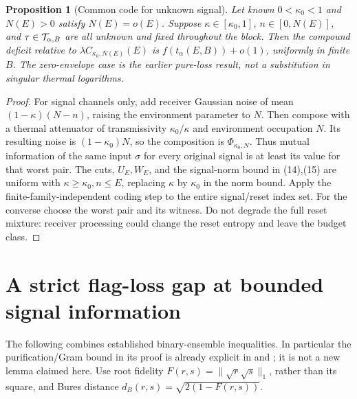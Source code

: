 \documentclass[11pt]{article}
\newtheorem{proposition}[theorem]{Proposition}
\begin{document}
\begin{proposition}[Common code for unknown signal]\label{prop:unknown}
Let known \(0<\kappa_0<1\) and \(N(E)>0\) satisfy \(N(E)=o(E)\).
Suppose \(\kappa\in[\kappa_0,1]\), \(n\in[0,N(E)]\), and
\(\tau\in{\cal T}_{\alpha,B}\) are all unknown and fixed throughout
the block. Then the compound deficit relative to
\(\lambda C_{\kappa_0,N(E)}(E)\) is \(f(t_\alpha(E,B))+o(1)\),
uniformly in finite \(B\). The zero-envelope case is the earlier
pure-loss result, not a substitution in singular thermal logarithms.
\end{proposition}
\begin{proof}
For signal channels only, add receiver Gaussian noise of mean
\((1-\kappa)(N-n)\), raising the environment parameter to \(N\).
Then compose with a thermal attenuator of transmissivity
\(\kappa_0/\kappa\) and environment occupation \(N\).
Its resulting noise is \((1-\kappa_0)N\), so the composition is
\(\Phi_{\kappa_0,N}\).
Thus mutual information of the same input \(\sigma\) for every original
signal is at least its value for that worst pair.
The cuts, \(U_E,W_E\), and the signal-norm bound in (14),(15) are
uniform with \(\kappa\ge\kappa_0,n\le E\), replacing \(\kappa\) by
\(\kappa_0\) in the norm bound. Apply the finite-family-independent
coding step to the entire signal/reset index set.
For the converse choose the worst pair and its witness.
Do not degrade the full reset mixture: receiver processing could change
the reset entropy and leave the budget class.
\end{proof}

\section{A strict flag-loss gap at bounded signal information}
The following combines established binary-ensemble inequalities.
In particular the purification/Gram bound in its proof is already
explicit in \cite[Corollary~4, Lemma~5]{roga} and
\cite[Eqs.~(3)--(6)]{fannes}; it is not a new lemma claimed here.
Use root fidelity \(F(r,s)=\|\sqrt r\sqrt s\|_1\), rather than its
square, and Bures distance \(d_B(r,s)=\sqrt{2(1-F(r,s))}\).
\end{document}
